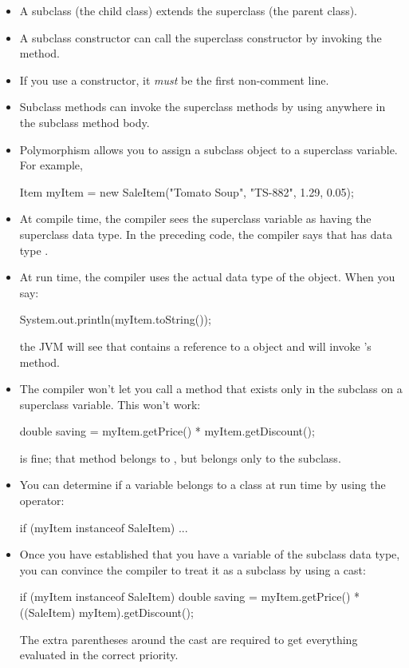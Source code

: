 \begin{itemize}
\item A subclass (the child class) extends the superclass (the parent class).
\item A subclass constructor can call the superclass constructor by invoking the  method.
\item If you use a  constructor, it {\em must} be the first non-comment line.
\item Subclass methods can invoke the superclass methods by using  anywhere in the subclass method body.
\item Polymorphism allows you to assign a subclass object to a superclass variable. For example,

\begin{code}
Item myItem = new SaleItem("Tomato Soup", "TS-882",
   1.29, 0.05);
\end{code}

\item At compile time, the compiler sees the superclass variable as having the superclass data type. In the preceding code, the compiler says that  has data type .

\item At run time, the compiler uses the actual data type of the object. When you say:

\begin{code}
System.out.println(myItem.toString());
\end{code}
    
the JVM will see that  contains a reference to a  object and will invoke 's  method.
\item The compiler won't let you call a method that exists only in the subclass on a superclass variable. This won't work:

\begin{code}
double saving = myItem.getPrice() * myItem.getDiscount();
\end{code}
    
 is fine; that method belongs to , but  belongs only to the subclass.
\item You can determine if a variable belongs to a class at run time by using the  operator:

\begin{code}
if (myItem instanceof SaleItem) {
    ...
}
\end{code}
    
\item Once you have established that you have a variable of the subclass data type, you can convince the compiler to treat it as a subclass by using a cast:

\begin{code}
if (myItem instanceof SaleItem) {
    double saving = myItem.getPrice() *
        ((SaleItem) myItem).getDiscount();
}
\end{code}
    
The extra parentheses around the cast are required to get everything evaluated in the correct priority.
\end{itemize}

